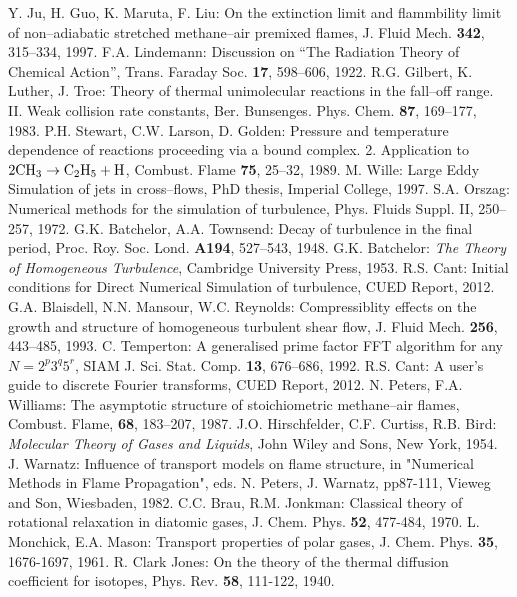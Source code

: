 \documentclass[dvips]{article}
\begin{document}
\begin{thebibliography}{99}
Y. Ju, H. Guo, K. Maruta, F. Liu: On the extinction
limit and flammbility limit of non--adiabatic stretched methane--air
premixed flames, J. Fluid Mech. {\bf 342}, 315--334, 1997.
F.A. Lindemann: Discussion on ``The Radiation Theory of
Chemical Action'', Trans. Faraday Soc. {\bf 17}, 598--606, 1922.
R.G. Gilbert, K. Luther, J. Troe: Theory of thermal
unimolecular reactions in the fall--off range. II. Weak collision rate
constants, Ber. Bunsenges. Phys. Chem.  {\bf 87}, 169--177, 1983.
P.H. Stewart, C.W. Larson, D. Golden: Pressure and
temperature dependence of reactions proceeding via a bound complex.
2. Application to $2{\rm CH}_{3} \rightarrow {\rm C}_{2}{\rm H}_{5} + {\rm H}$,
Combust. Flame {\bf 75}, 25--32, 1989.
M. Wille: Large Eddy Simulation of jets in cross--flows,
PhD thesis, Imperial College, 1997.
S.A. Orszag: Numerical methods for the simulation of
turbulence, Phys. Fluids Suppl. II, 250--257, 1972.
G.K. Batchelor, A.A. Townsend: Decay of
turbulence in the final period, Proc. Roy. Soc. Lond. {\bf A194},
527--543, 1948.
G.K. Batchelor: {\it The Theory of Homogeneous
Turbulence}, Cambridge University Press, 1953.
R.S. Cant: Initial conditions for Direct Numerical
Simulation of turbulence, CUED Report, 2012.
G.A. Blaisdell, N.N. Mansour, W.C. Reynolds:
Compressiblity effects on the growth and structure of homogeneous
turbulent shear flow, J. Fluid Mech. {\bf 256}, 443--485, 1993.
C. Temperton: A generalised prime factor FFT
algorithm for any $N=2^{p}3^{q}5^{r}$, SIAM J. Sci. Stat. Comp. {\bf 13},
676--686, 1992.
R.S. Cant: A user's guide to discrete Fourier transforms,
CUED Report, 2012.
N. Peters, F.A. Williams: The asymptotic structure of
stoichiometric methane--air flames, Combust. Flame, {\bf 68}, 183--207, 1987.
J.O. Hirschfelder, C.F. Curtiss, R.B. Bird: {\it Molecular Theory
of Gases and Liquids}, John Wiley and Sons, New York, 1954.
J. Warnatz: Influence of transport models on
flame structure, in "Numerical Methods in Flame Propagation", eds. N. Peters,
J. Warnatz, pp87-111, Vieweg and Son, Wiesbaden, 1982. 
C.C. Brau, R.M. Jonkman: Classical theory of
rotational relaxation in diatomic gases, J. Chem. Phys. {\bf 52},
477-484, 1970.
L. Monchick, E.A. Mason: Transport properties of
polar gases, J. Chem. Phys. {\bf 35}, 1676-1697, 1961.
R. Clark Jones: On the theory of the thermal
diffusion coefficient for isotopes, Phys. Rev. {\bf 58}, 111-122,
1940.
\end{thebibliography}
\end{document}
